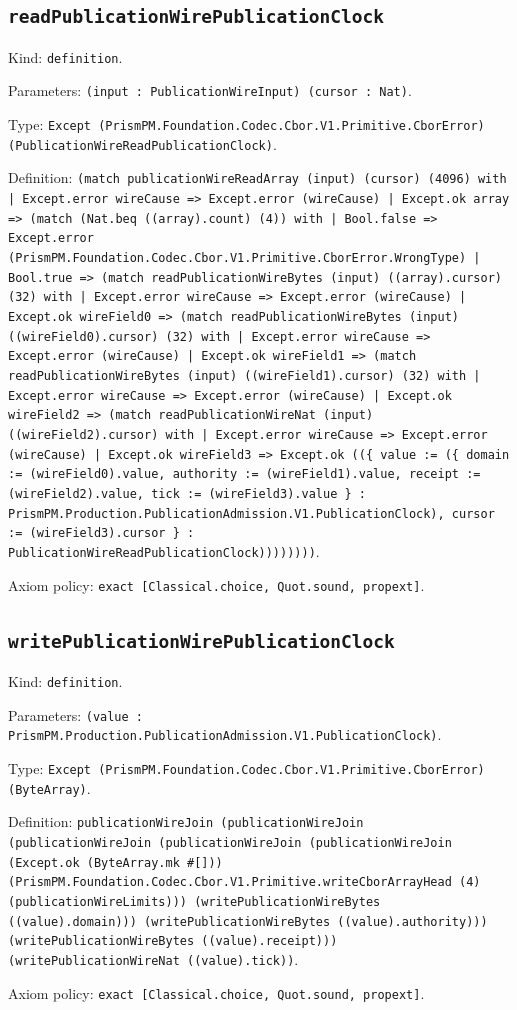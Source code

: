 \documentclass[11pt]{article}
\begin{document}
\subsection*{\texttt{readPublicationWirePublicationClock}}
\noindent Kind: \texttt{definition}.\par
\noindent Parameters: \texttt{(input : PublicationWireInput) (cursor : Nat)}.\par
\noindent Type: \texttt{Except (PrismPM.Foundation.Codec.Cbor.V1.Primitive.CborError) (PublicationWireReadPublicationClock)}.\par
\noindent Definition: \texttt{(match publicationWireReadArray (input) (cursor) (4096) with | Except.error wireCause => Except.error (wireCause) | Except.ok array => (match (Nat.beq ((array).count) (4)) with | Bool.false => Except.error (PrismPM.Foundation.Codec.Cbor.V1.Primitive.CborError.WrongType) | Bool.true => (match readPublicationWireBytes (input) ((array).cursor) (32) with | Except.error wireCause => Except.error (wireCause) | Except.ok wireField0 => (match readPublicationWireBytes (input) ((wireField0).cursor) (32) with | Except.error wireCause => Except.error (wireCause) | Except.ok wireField1 => (match readPublicationWireBytes (input) ((wireField1).cursor) (32) with | Except.error wireCause => Except.error (wireCause) | Except.ok wireField2 => (match readPublicationWireNat (input) ((wireField2).cursor) with | Except.error wireCause => Except.error (wireCause) | Except.ok wireField3 => Except.ok ((\{ value := (\{ domain := (wireField0).value, authority := (wireField1).value, receipt := (wireField2).value, tick := (wireField3).value \} : PrismPM.Production.PublicationAdmission.V1.PublicationClock), cursor := (wireField3).cursor \} : PublicationWireReadPublicationClock))))))))}.\par
\noindent Axiom policy: \texttt{exact [Classical.choice, Quot.sound, propext]}.\par
\subsection*{\texttt{writePublicationWirePublicationClock}}
\noindent Kind: \texttt{definition}.\par
\noindent Parameters: \texttt{(value : PrismPM.Production.PublicationAdmission.V1.PublicationClock)}.\par
\noindent Type: \texttt{Except (PrismPM.Foundation.Codec.Cbor.V1.Primitive.CborError) (ByteArray)}.\par
\noindent Definition: \texttt{publicationWireJoin (publicationWireJoin (publicationWireJoin (publicationWireJoin (publicationWireJoin (Except.ok (ByteArray.mk \#[])) (PrismPM.Foundation.Codec.Cbor.V1.Primitive.writeCborArrayHead (4) (publicationWireLimits))) (writePublicationWireBytes ((value).domain))) (writePublicationWireBytes ((value).authority))) (writePublicationWireBytes ((value).receipt))) (writePublicationWireNat ((value).tick))}.\par
\noindent Axiom policy: \texttt{exact [Classical.choice, Quot.sound, propext]}.\par
\end{document}
